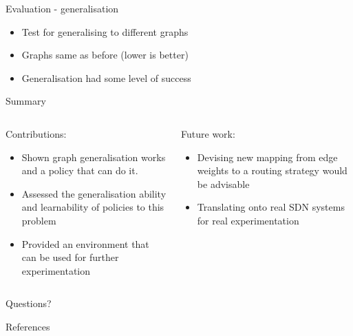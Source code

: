 \documentclass{beamer}
\begin{document}
\begin{frame}{Evaluation - generalisation}
  \begin{itemize}
    \item Test for generalising to different graphs
    \item Graphs same as before (lower is better)
    \item Generalisation had some level of success
  \end{itemize}
  \centering
  \resizebox{0.7\textwidth}{!}{}
\end{frame}

\begin{frame}{Summary}
\begin{columns}
  \begin{column}{0.5\textwidth}
    Contributions:
    \begin{itemize}
      \item Shown graph generalisation works and a policy that can do it.
      \item Assessed the generalisation ability and learnability of policies to this problem
      \item Provided an environment that can be used for further experimentation
    \end{itemize}
  \end{column}
  \begin{column}{0.5\textwidth}
    Future work:
    \begin{itemize}
      \item Devising new mapping from edge weights to a routing strategy would be advisable
      \item Translating onto real SDN systems for real experimentation
    \end{itemize}
    \vspace{3\baselineskip}
  \end{column}
\end{columns}
\end{frame}

\begin{frame}
\begin{center}
\textcolor{CBlue}{\Huge Questions?}
\end{center}
\end{frame}

\begin{frame}{References}
    \footnotesize
    \printbibliography
\end{frame}
\end{document}
